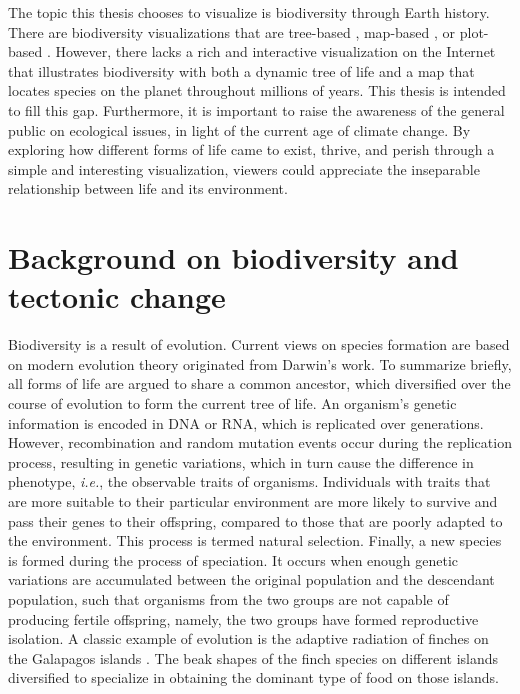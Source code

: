 \documentclass[11pt, a4paper,oneside,chapterprefix=false]{scrbook}
\begin{document}
The topic this thesis chooses to visualize is biodiversity through Earth history. There are biodiversity visualizations that are tree-based \cite{block2012deeptree}, map-based \cite{janicki2016visualizing}, or plot-based \cite{liang2019bioactivity}. However, there lacks a rich and interactive visualization on the Internet that illustrates biodiversity with both a dynamic tree of life and a map that locates species on the planet throughout millions of years. This thesis is intended to fill this gap. Furthermore, it is important to raise the awareness of the general public on ecological issues, in light of the current age of climate change. By exploring how different forms of life came to exist, thrive, and perish through a simple and interesting visualization, viewers could appreciate the inseparable relationship between life and its environment.

\section{Background on biodiversity and tectonic change} \label{sec: two}
Biodiversity is a result of evolution. Current views on species formation are based on modern evolution theory \cite{bowler1989evolution} originated from Darwin's work. To summarize briefly, all forms of life are argued to share a common ancestor, which diversified over the course of evolution to form the current tree of life. An organism's genetic information is encoded in DNA or RNA, which is replicated over generations. However, recombination and random mutation events occur during the replication process, resulting in genetic variations, which in turn cause the difference in phenotype, \emph{i.e.}, the observable traits of organisms. Individuals with traits that are more suitable to their particular environment are more likely to survive and pass their genes to their offspring, compared to those that are poorly adapted to the environment. This process is termed natural selection. Finally, a new species is formed during the process of speciation. It occurs when enough genetic variations are accumulated between the original population and the descendant population, such that organisms from the two groups are not capable of producing fertile offspring, namely, the two groups have formed reproductive isolation. A classic example of evolution is the adaptive radiation of finches on the Galapagos islands \cite{lack1983darwin}. The beak shapes of the finch species on different islands diversified to specialize in obtaining the dominant type of food on those islands.  \\
\end{document}
